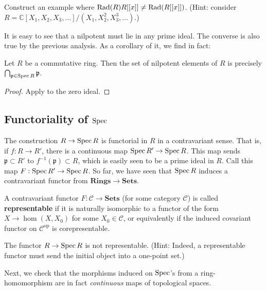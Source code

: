 \begin{exercise} 
Construct an example where $\operatorname{Rad}(R) R[[x]] \neq \operatorname{Rad}(R[[x]])$. (Hint: consider
$R = \mathbb{C}[X_1, X_2, X_3, \dots]/(X_1, X_2^2, X_3^3, \dots)$.)
\end{exercise} 


It is easy to see that a nilpotent must lie in  any prime ideal. The converse is
also true by the previous analysis.
As a corollary of it, we find in fact:
\begin{corollary} \label{nilradicalisprimes}
Let $R$ be a commutative ring. Then the set of nilpotent elements of $R$ is
precisely $\bigcap_{\mathfrak{p} \in \operatorname{Spec} R} \mathfrak{p}$.
\end{corollary} 
\begin{proof} 
Apply  to the zero ideal.
\end{proof} 


\subsection{Functoriality of $\operatorname{Spec}$}
 The construction $R \to \operatorname{Spec} R$ is functorial in $R$ in a
contravariant sense. That is, if $f: R \to R'$, there is a
continuous map $\operatorname{Spec}
R' \to \operatorname{Spec} R$. This map sends $\mathfrak{p} \subset R'$ to
$f^{-1}(\mathfrak{p}) \subset R$, which is easily seen to be a
prime ideal
in $R$. Call this map $F: \operatorname{Spec} R' \to \operatorname{Spec} R$. So far, we have
seen that
$\operatorname{Spec} R$ induces a contravariant functor from $\mathbf{Rings}
\to \mathbf{Sets}$.

\begin{exercise} 
A contravariant functor $F: \mathcal{C} \to \mathbf{Sets}$ (for
some category
$\mathcal{C}$) is called \textbf{representable} if it is
naturally isomorphic
to a functor of the form $X \to \hom(X, X_0)$ for some $X_0 \in
\mathcal{C}$,
or equivalently if the induced covariant functor on
$\mathcal{C}^{\mathrm{op}}$ is corepresentable. 

The functor $R \to \operatorname{Spec} R $ is not representable. (Hint:
Indeed, a representable
functor must send the initial object into a one-point set.)
\end{exercise} 

Next, we check that the morphisms induced on $\operatorname{Spec}$'s from a
ring-homomorphism are in fact \emph{continuous} maps of
topological spaces.

